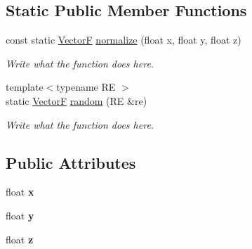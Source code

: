 \subsection*{Static Public Member Functions}
\begin{DoxyCompactItemize}
\item 
const static \hyperlink{structVectorF}{Vector\+F} \hyperlink{structVectorF_a553da195f30b0f0de5d856c80f7348ff}{normalize} (float x, float y, float z)
\begin{DoxyCompactList}\small\item\em Write what the function does here. \end{DoxyCompactList}\item 
{\footnotesize template$<$typename R\+E $>$ }\\static \hyperlink{structVectorF}{Vector\+F} \hyperlink{structVectorF_a4fa271c1382d384676561cc539b9abdb}{random} (R\+E \&re)
\begin{DoxyCompactList}\small\item\em Write what the function does here. \end{DoxyCompactList}\end{DoxyCompactItemize}
\subsection*{Public Attributes}
\begin{DoxyCompactItemize}
\item 
\hypertarget{structVectorF_ab7c47ac5d2e6cd5255e06fd70075a380}{float {\bfseries x}}\label{structVectorF_ab7c47ac5d2e6cd5255e06fd70075a380}

\item 
\hypertarget{structVectorF_a097b595dea00472dbbbdb507daef7495}{float {\bfseries y}}\label{structVectorF_a097b595dea00472dbbbdb507daef7495}

\item 
\hypertarget{structVectorF_a6e8e1e9a38b89c34fa378dc34b3ef915}{float {\bfseries z}}\label{structVectorF_a6e8e1e9a38b89c34fa378dc34b3ef915}

\end{DoxyCompactItemize}
